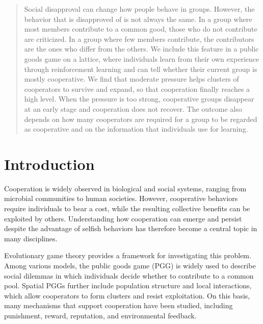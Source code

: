 \documentclass[%
  aip,cha,
  amsmath,amssymb,
  reprint,
  floatfix,
  article-title,
]{revtex4-2}
\begin{document}
\begin{quotation}
Social disapproval can change how people behave in groups. However, the behavior that is disapproved of is not always the same. In a group where most members contribute to a common good, those who do not contribute are criticized. In a group where few members contribute, the contributors are the ones who differ from the others. We include this feature in a public goods game on a lattice, where individuals learn from their own experience through reinforcement learning and can tell whether their current group is mostly cooperative. We find that moderate pressure helps clusters of cooperators to survive and expand, so that cooperation finally reaches a high level. When the pressure is too strong, cooperative groups disappear at an early stage and cooperation does not recover. The outcome also depends on how many cooperators are required for a group to be regarded as cooperative and on the information that individuals use for learning.
\end{quotation}

\section{Introduction}\label{sec:intro}

Cooperation is widely observed in biological and social systems, ranging from microbial communities to human societies.\cite{axelrod1981evolution,rand2013human}
However, cooperative behaviors require individuals to bear a cost, while the resulting collective benefits can be exploited by others.\cite{sigmund2010calculus}
Understanding how cooperation can emerge and persist despite the advantage of selfish behaviors has therefore become a central topic in many disciplines.\cite{pennisi2005did}

Evolutionary game theory provides a framework for investigating this problem.\cite{smith1973logic,taylor1978evolutionary,nowak2006evolutionary}
Among various models, the public goods game (PGG) is widely used to describe social dilemmas in which individuals decide whether to contribute to a common pool.\cite{hauert2006evolutionary,szolnoki2016competition,zhu2024stochastic}
Spatial PGGs further include population structure and local interactions, which allow cooperators to form clusters and resist exploitation.\cite{nowak1992evolutionary,ohtsuki2006simple,szabo2007evolutionary,szolnoki2009impact,perc2013evolutionary,perc2017statistical,zhu2025multilayer}
On this basis, many mechanisms that support cooperation have been studied,\cite{perc2010coevolutionary} including punishment,\cite{fehr2002altruistic,helbing2010punish,chen2014probabilistic,szolnoki2017antisocial,xie2024regulation} reward,\cite{rand2009positive,szolnoki2010reward} reputation,\cite{milinski2002helps,zhu2024synergy} and environmental feedback.\cite{weitz2016oscillating,tilman2020evolutionary,wang2020eco,hu2025dynamic}
\end{document}
